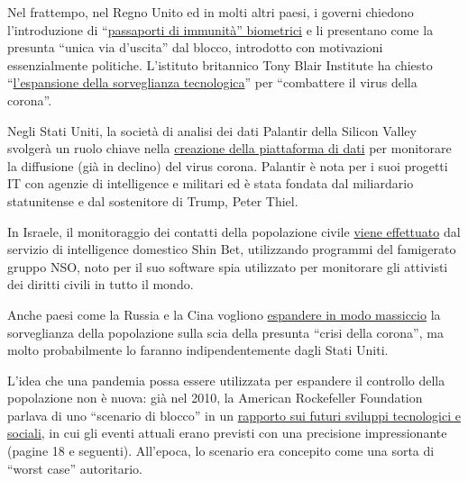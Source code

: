 Nel frattempo, nel Regno Unito ed in molti altri paesi, i governi
chiedono l'introduzione di
``\href{https://www.msn.com/en-us/money/news/the-uk-just-published-blueprints-for-covid-19-immunity-passports-a-controversial-potential-route-out-of-lockdown/ar-BB13qr8L}{passaporti
di immunità'' biometrici} e li presentano come la presunta ``unica via
d'uscita'' dal blocco, introdotto con motivazioni essenzialmente
politiche. L'istituto britannico Tony Blair Institute ha chiesto
``\href{https://www.theguardian.com/world/2020/apr/24/surveillance-a-price-worth-paying-to-beat-coronavirus-says-blair-thinktank}{l'espansione
della sorveglianza tecnologica}'' per ``combattere il virus della
corona''.

Negli Stati Uniti, la società di analisi dei dati Palantir della Silicon
Valley svolgerà un ruolo chiave nella
\href{https://www.msn.com/en-us/news/us/team-trump-turns-to-peter-thiel-s-palantir-to-track-virus/ar-BB130qfE}{creazione
della piattaforma di dati} per monitorare la diffusione (già in declino)
del virus corona. Palantir è nota per i suoi progetti IT con agenzie di
intelligence e militari ed è stata fondata dal miliardario statunitense
e dal sostenitore di Trump, Peter Thiel.

In Israele, il monitoraggio dei contatti della popolazione civile
\href{https://www.techdirt.com/articles/20200402/14261944226/controversial-spyware-vendor-nso-group-is-helping-israeli-government-spy-own-citizens.shtml}{viene
effettuato} dal servizio di intelligence domestico Shin Bet, utilizzando
programmi del famigerato gruppo NSO, noto per il suo software spia
utilizzato per monitorare gli attivisti dei diritti civili in tutto il
mondo.

Anche paesi come la Russia e la Cina vogliono
\href{https://www.npr.org/sections/coronavirus-live-updates/2020/04/01/825329399/moscow-launches-new-surveillance-app-to-track-residents-in-coronavirus-lockdown}{espandere
in modo massiccio} la sorveglianza della popolazione sulla scia della
presunta ``crisi della corona'', ma molto probabilmente lo faranno
indipendentemente dagli Stati Uniti.

L'idea che una pandemia possa essere utilizzata per espandere il
controllo della popolazione non è nuova: già nel 2010, la American
Rockefeller Foundation parlava di uno ``scenario di blocco'' in un
\href{https://swprs.files.wordpress.com/2020/04/rockefeller-foundation-scenarios-2010.pdf}{rapporto
sui futuri sviluppi tecnologici e sociali}, in cui gli eventi attuali
erano previsti con una precisione impressionante (pagine 18 e seguenti).
All'epoca, lo scenario era concepito come una sorta di ``worst case''
autoritario.

